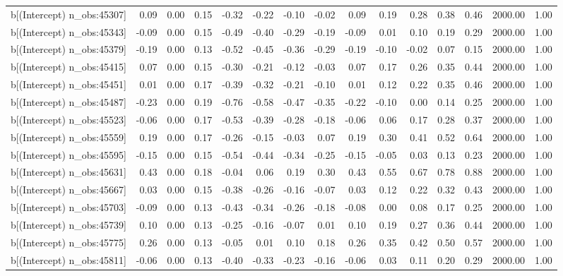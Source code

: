 \begin{table}[ht]
\begin{tabular}{rrrrrrrrrrrrrrr}
  b[(Intercept) n\_obs:45307] & 0.09 & 0.00 & 0.15 & -0.32 & -0.22 & -0.10 & -0.02 & 0.09 & 0.19 & 0.28 & 0.38 & 0.46 & 2000.00 & 1.00 \\ 
  b[(Intercept) n\_obs:45343] & -0.09 & 0.00 & 0.15 & -0.49 & -0.40 & -0.29 & -0.19 & -0.09 & 0.01 & 0.10 & 0.19 & 0.29 & 2000.00 & 1.00 \\ 
  b[(Intercept) n\_obs:45379] & -0.19 & 0.00 & 0.13 & -0.52 & -0.45 & -0.36 & -0.29 & -0.19 & -0.10 & -0.02 & 0.07 & 0.15 & 2000.00 & 1.00 \\ 
  b[(Intercept) n\_obs:45415] & 0.07 & 0.00 & 0.15 & -0.30 & -0.21 & -0.12 & -0.03 & 0.07 & 0.17 & 0.26 & 0.35 & 0.44 & 2000.00 & 1.00 \\ 
  b[(Intercept) n\_obs:45451] & 0.01 & 0.00 & 0.17 & -0.39 & -0.32 & -0.21 & -0.10 & 0.01 & 0.12 & 0.22 & 0.35 & 0.46 & 2000.00 & 1.00 \\ 
  b[(Intercept) n\_obs:45487] & -0.23 & 0.00 & 0.19 & -0.76 & -0.58 & -0.47 & -0.35 & -0.22 & -0.10 & 0.00 & 0.14 & 0.25 & 2000.00 & 1.00 \\ 
  b[(Intercept) n\_obs:45523] & -0.06 & 0.00 & 0.17 & -0.53 & -0.39 & -0.28 & -0.18 & -0.06 & 0.06 & 0.17 & 0.28 & 0.37 & 2000.00 & 1.00 \\ 
  b[(Intercept) n\_obs:45559] & 0.19 & 0.00 & 0.17 & -0.26 & -0.15 & -0.03 & 0.07 & 0.19 & 0.30 & 0.41 & 0.52 & 0.64 & 2000.00 & 1.00 \\ 
  b[(Intercept) n\_obs:45595] & -0.15 & 0.00 & 0.15 & -0.54 & -0.44 & -0.34 & -0.25 & -0.15 & -0.05 & 0.03 & 0.13 & 0.23 & 2000.00 & 1.00 \\ 
  b[(Intercept) n\_obs:45631] & 0.43 & 0.00 & 0.18 & -0.04 & 0.06 & 0.19 & 0.30 & 0.43 & 0.55 & 0.67 & 0.78 & 0.88 & 2000.00 & 1.00 \\ 
  b[(Intercept) n\_obs:45667] & 0.03 & 0.00 & 0.15 & -0.38 & -0.26 & -0.16 & -0.07 & 0.03 & 0.12 & 0.22 & 0.32 & 0.43 & 2000.00 & 1.00 \\ 
  b[(Intercept) n\_obs:45703] & -0.09 & 0.00 & 0.13 & -0.43 & -0.34 & -0.26 & -0.18 & -0.08 & 0.00 & 0.08 & 0.17 & 0.25 & 2000.00 & 1.00 \\ 
  b[(Intercept) n\_obs:45739] & 0.10 & 0.00 & 0.13 & -0.25 & -0.16 & -0.07 & 0.01 & 0.10 & 0.19 & 0.27 & 0.36 & 0.44 & 2000.00 & 1.00 \\ 
  b[(Intercept) n\_obs:45775] & 0.26 & 0.00 & 0.13 & -0.05 & 0.01 & 0.10 & 0.18 & 0.26 & 0.35 & 0.42 & 0.50 & 0.57 & 2000.00 & 1.00 \\ 
  b[(Intercept) n\_obs:45811] & -0.06 & 0.00 & 0.13 & -0.40 & -0.33 & -0.23 & -0.16 & -0.06 & 0.03 & 0.11 & 0.20 & 0.29 & 2000.00 & 1.00 \\ 

\end{tabular}
\end{table}
